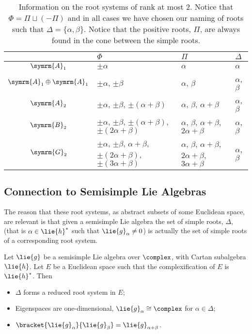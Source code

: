 \documentclass[fleqn]{NotesClass}
\newcommand{\isomorphic}{\cong}
\newcommand{\dynkin}[2]{\symrm{#1}_{#2}}
\begin{document}
    \begin{table}
        \centering
        \caption[Root systems of rank at most 2]{Information on the root systems of rank at most \(2\). Notice that \(\Phi = \Pi \sqcup (-\Pi)\) and in all cases we have chosen our naming of roots such that \(\Delta = \{\alpha, \beta\}\). Notice that the positive roots, \(\Pi\), are always found in the cone between the simple roots.}
        \label{tab:root systems of rank 2}
        \small
        \begin{tabular}{clll}
            \toprule
            & \(\Phi\) & \(\Pi\) & \(\Delta\) \\ \midrule
            \(\dynkin{A}{1}\) & \(\pm\alpha\) & \(\alpha\) & \(\alpha\)\\
            \(\dynkin{A}{1} \oplus \dynkin{A}{1}\) & \(\pm\alpha\), \(\pm\beta\) & \(\alpha\), \(\beta\) & \(\alpha\), \(\beta\)\\
            \(\dynkin{A}{2}\) & \(\pm \alpha\), \(\pm \beta\), \(\pm(\alpha + \beta)\) & \(\alpha\), \(\beta\), \(\alpha + \beta\) & \(\alpha\), \(\beta\)\\
            \(\dynkin{B}{2}\) & \(\pm\alpha\), \(\pm\beta\), \(\pm(\alpha + \beta)\), \(\pm(2\alpha + \beta)\) & \(\alpha\), \(\beta\), \(\alpha + \beta\), \(2\alpha + \beta\) & \(\alpha\), \(\beta\)\\
            \(\dynkin{G}{2}\) & \(\pm \alpha\), \(\pm\beta\), \(\alpha + \beta\), \(\pm(2\alpha + \beta)\), \(\pm(3\alpha + \beta)\) & \(\alpha\), \(\beta\), \(\alpha + \beta\), \(2\alpha + \beta\), \(3\alpha + \beta\) & \(\alpha\), \(\beta\) \\ \bottomrule
        \end{tabular}
    \end{table}
    
    \subsection{Connection to Semisimple Lie Algebras}
    The reason that these root systems, as abstract subsets of some Euclidean space, are relevant is that given a semisimple Lie algebra the set of simple roots, \(\Delta\), (that is \(\alpha \in \lie{h}^*\) such that \(\lie{g}_\alpha \ne 0\)) is actually the set of simple roots of a corresponding root system.
    
    \begin{thm}{}{}
        Let \(\lie{g}\) be a semisimple Lie algebra over \(\complex\), with Cartan subalgebra \(\lie{h}\).
        Let \(E\) be a Euclidean space such that the complexification of \(E\) is \(\lie{h}^*\).
        Then
        \begin{itemize}
            \item \(\Delta\) forms a reduced root system in \(E\);
            \item Eigenspaces are one-dimensional, \(\lie{g}_\alpha \isomorphic \complex\) for \(\alpha \in \Delta\);
            \item \(\bracket{\lie{g}_\alpha}{\lie{g}_\beta} = \lie{g}_{\alpha + \beta}\).
        \end{itemize}
    \end{thm}
    
\end{document}
